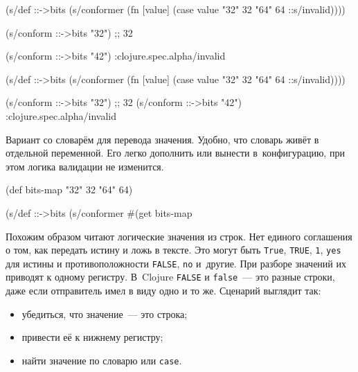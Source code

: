 
\ifx\devicetype\mobile

\begin{english}
  \begin{clojure}
(s/def ::->bits
  (s/conformer
   (fn [value]
     (case value
       "32" 32 "64" 64
       ::s/invalid))))

(s/conform ::->bits "32") ;; 32

(s/conform ::->bits "42")
:clojure.spec.alpha/invalid
  \end{clojure}
\end{english}

\else

\begin{english}
  \begin{clojure}
(s/def ::->bits
  (s/conformer
   (fn [value]
     (case value
       "32" 32 "64" 64
       ::s/invalid))))

(s/conform ::->bits "32") ;; 32
(s/conform ::->bits "42") :clojure.spec.alpha/invalid
  \end{clojure}
\end{english}

\fi


Вариант со словарём для перевода значения. Удобно, что словарь живёт в
отдельной переменной. Его легко дополнить или вынести в~конфигурацию, при этом
логика валидации не изменится.

\begin{english}
  \begin{clojure}
(def bits-map {"32" 32 "64" 64})

(s/def ::->bits
  (s/conformer
   #(get bits-map %
  \end{clojure}
\end{english}

Похожим образом читают логические значения из строк. Нет единого соглашения о
том, как передать истину и ложь в тексте. Это могут быть \verb|True|,
\verb|TRUE|, \verb|1|, \verb|yes| для истины и противоположности
\verb|FALSE|, \verb|no| и~другие. При разборе значений их приводят к одному
регистру. В~Clojure \verb|FALSE| и \verb|false|~--- это разные строки, даже если
отправитель имел в виду одно и то же. Сценарий выглядит так:

\begin{itemize}

\item
  убедиться, что значение~--- это строка;

\item
  привести её к нижнему регистру;

\item
  найти значение по словарю или \verb|case|.

\end{itemize}

